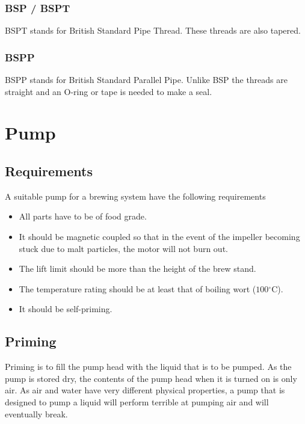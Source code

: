\documentclass[11pt,fleqn,openany]{book} %
\newcommand{\degree}{\ensuremath{^\circ}}
\begin{document}
\subsection{BSP / BSPT}

BSPT stands for British Standard Pipe Thread. These threads are also tapered.

\subsection{BSPP}

BSPP stands for British Standard Parallel Pipe. Unlike BSP the threads are straight and an O-ring or tape is needed to make a seal.



\chapter{Pump}

\section{Requirements}

A suitable pump for a brewing system have the following requirements

\begin{itemize}
\item All parts have to be of food grade.
\item It should be magnetic coupled so that in the event of the impeller becoming stuck due to malt particles, the motor will not burn out.
\item The lift limit should be more than the height of the brew stand.
\item The temperature rating should be at least that of boiling wort ($100\degree$C).
\item It should be self-priming.
\end{itemize}

\section{Priming}

Priming is to fill the pump head with the liquid that is to be pumped. As the pump is stored dry, the contents of the pump head when it is turned on is only air. As air and water have very different physical properties, a pump that is designed to pump a liquid will perform terrible at pumping air and will eventually break.\\
\end{document}
